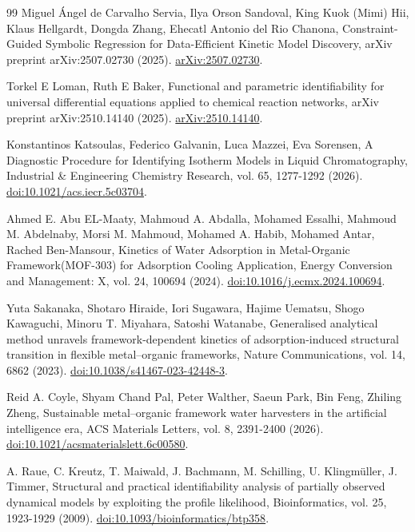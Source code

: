 \begin{thebibliography}{99}
 Miguel Ángel de Carvalho Servia, Ilya Orson Sandoval, King Kuok (Mimi) Hii, Klaus Hellgardt, Dongda Zhang, Ehecatl Antonio del Rio Chanona, Constraint-Guided Symbolic Regression for Data-Efficient Kinetic Model Discovery, arXiv preprint arXiv:2507.02730 (2025). \href{https://arxiv.org/abs/2507.02730}{arXiv:2507.02730}.

 Torkel E Loman, Ruth E Baker, Functional and parametric identifiability for universal differential equations applied to chemical reaction networks, arXiv preprint arXiv:2510.14140 (2025). \href{https://arxiv.org/abs/2510.14140}{arXiv:2510.14140}.

 Konstantinos Katsoulas, Federico Galvanin, Luca Mazzei, Eva Sorensen, A Diagnostic Procedure for Identifying Isotherm Models in Liquid Chromatography, Industrial \& Engineering Chemistry Research, vol. 65, 1277-1292 (2026). \href{https://doi.org/10.1021/acs.iecr.5c03704}{doi:10.1021/acs.iecr.5c03704}.

 Ahmed E. Abu EL-Maaty, Mahmoud A. Abdalla, Mohamed Essalhi, Mahmoud M. Abdelnaby, Morsi M. Mahmoud, Mohamed A. Habib, Mohamed Antar, Rached Ben-Mansour, Kinetics of Water Adsorption in Metal-Organic Framework(MOF-303) for Adsorption Cooling Application, Energy Conversion and Management: X, vol. 24, 100694 (2024). \href{https://doi.org/10.1016/j.ecmx.2024.100694}{doi:10.1016/j.ecmx.2024.100694}.

 Yuta Sakanaka, Shotaro Hiraide, Iori Sugawara, Hajime Uematsu, Shogo Kawaguchi, Minoru T. Miyahara, Satoshi Watanabe, Generalised analytical method unravels framework-dependent kinetics of adsorption-induced structural transition in flexible metal--organic frameworks, Nature Communications, vol. 14, 6862 (2023). \href{https://doi.org/10.1038/s41467-023-42448-3}{doi:10.1038/s41467-023-42448-3}.

 Reid A. Coyle, Shyam Chand Pal, Peter Walther, Saeun Park, Bin Feng, Zhiling Zheng, Sustainable metal--organic framework water harvesters in the artificial intelligence era, ACS Materials Letters, vol. 8, 2391-2400 (2026). \href{https://doi.org/10.1021/acsmaterialslett.6c00580}{doi:10.1021/acsmaterialslett.6c00580}.

 A. Raue, C. Kreutz, T. Maiwald, J. Bachmann, M. Schilling, U. Klingmüller, J. Timmer, Structural and practical identifiability analysis of partially observed dynamical models by exploiting the profile likelihood, Bioinformatics, vol. 25, 1923-1929 (2009). \href{https://doi.org/10.1093/bioinformatics/btp358}{doi:10.1093/bioinformatics/btp358}.


\end{thebibliography}
